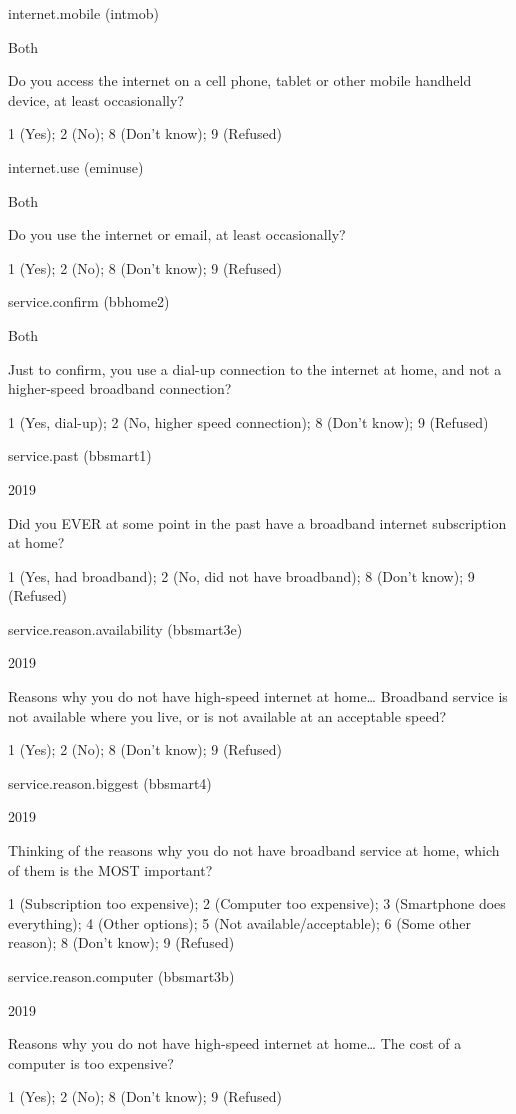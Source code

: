 \documentclass[]{book}
\begin{document}
internet.mobile (intmob)

Both

Do you access the internet on a cell phone, tablet or other mobile
handheld device, at least occasionally?

1 (Yes); 2 (No); 8 (Don't know); 9 (Refused)

internet.use (eminuse)

Both

Do you use the internet or email, at least occasionally?

1 (Yes); 2 (No); 8 (Don't know); 9 (Refused)

service.confirm (bbhome2)

Both

Just to confirm, you use a dial-up connection to the internet at home,
and not a higher-speed broadband connection?

1 (Yes, dial-up); 2 (No, higher speed connection); 8 (Don't know); 9
(Refused)

service.past (bbsmart1)

2019

Did you EVER at some point in the past have a broadband internet
subscription at home?

1 (Yes, had broadband); 2 (No, did not have broadband); 8 (Don't know);
9 (Refused)

service.reason.availability (bbsmart3e)

2019

Reasons why you do not have high-speed internet at home\ldots{}
Broadband service is not available where you live, or is not available
at an acceptable speed?

1 (Yes); 2 (No); 8 (Don't know); 9 (Refused)

service.reason.biggest (bbsmart4)

2019

Thinking of the reasons why you do not have broadband service at home,
which of them is the MOST important?

1 (Subscription too expensive); 2 (Computer too expensive); 3
(Smartphone does everything); 4 (Other options); 5 (Not
available/acceptable); 6 (Some other reason); 8 (Don't know); 9
(Refused)

service.reason.computer (bbsmart3b)

2019

Reasons why you do not have high-speed internet at home\ldots{} The cost
of a computer is too expensive?

1 (Yes); 2 (No); 8 (Don't know); 9 (Refused)
\end{document}
